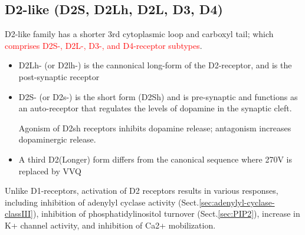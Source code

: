 \subsection{D2-like (D2S, D2Lh, D2L, D3, D4)}
\label{sec:D2-like-receptors}

D2-like family has a shorter 3rd cytoplasmic loop and carboxyl tail; which
\textcolor{red}{comprises D2S-, D2L-, D3-, and D4-receptor subtypes}.
\begin{itemize}
  \item  D2Lh- (or D2lh-) is the cannonical long-form of the D2-receptor, and is
  the post-synaptic receptor
  
  \item D2S- (or D2s-) is the short form (D2Sh) and is pre-synaptic and
  functions as an auto-receptor that regulates the levels of dopamine in the
  synaptic cleft.
  
  Agonism of D2sh receptors inhibits dopamine release; antagonism increases
  dopaminergic release.
  
  \item A third D2(Longer) form differs from the canonical sequence where 270V
  is replaced by VVQ
\end{itemize}


Unlike D1-receptors, activation of D2 receptors results in various responses,
including inhibition of adenylyl cyclase activity
(Sect.\ref{sec:adenylyl-cyclase-classIII}), inhibition of phosphatidylinositol
turnover (Sect.\ref{sec:PIP2}), increase in K+ channel activity, and inhibition
of Ca2+ mobilization.
  
